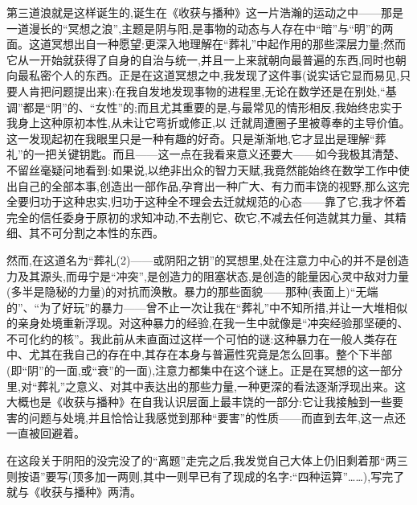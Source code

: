 第三道浪就是这样诞生的,诞生在《收获与播种》这一片浩瀚的运动之中——那是一道漫长的“冥想之浪”,主题是阴与阳,是事物的动态与人存在中“暗”与“明”的两面。这道冥想出自一种愿望:更深入地理解在“葬礼”中起作用的那些深层力量;然而它从一开始就获得了自身的自治与统一,并且一上来就朝向最普遍的东西,同时也朝向最私密个人的东西。正是在这道冥想之中,我发现了这件事(说实话它显而易见,只要人肯把问题提出来):在我自发地发现事物的进程里,无论在数学还是在别处,“基调”都是“阴”的、“女性”的;而且尤其重要的是,与最常见的情形相反,我始终忠实于我身上这种原初本性,从未让它弯折或修正,以
%
迁就周遭圈子里被尊奉的主导价值。这一发现起初在我眼里只是一种有趣的好奇。只是渐渐地,它才显出是理解“葬礼”的一把关键钥匙。而且——这一点在我看来意义还要大——如今我极其清楚、不留丝毫疑问地看到:如果说,以绝非出众的智力天赋,我竟然能始终在数学工作中使出自己的全部本事,创造出一部作品,孕育出一种广大、有力而丰饶的视野,那么这完全要归功于这种忠实,归功于这种全不理会去迁就规范的心态——靠了它,我才怀着完全的信任委身于原初的求知冲动,不去削它、砍它,不减去任何造就其力量、其精细、其不可分割之本性的东西。

然而,在这道名为“葬礼(2)——或阴阳之钥”的冥想里,处在注意力中心的并不是创造力及其源头,而毋宁是“冲突”,是创造力的阻塞状态,是创造的能量因心灵中敌对力量(多半是隐秘的力量)的对抗而涣散。暴力的那些面貌——那种(表面上)“无端的”、“为了好玩”的暴力——曾不止一次让我在“葬礼”中不知所措,并让一大堆相似的亲身处境重新浮现。对这种暴力的经验,在我一生中就像是“冲突经验那坚硬的、不可化约的核”。我此前从未直面过这样一个可怕的谜:这种暴力在一般人类存在中、尤其在我自己的存在中,其存在本身与普遍性究竟是怎么回事。整个下半部(即“阴”的一面,或“衰”的一面),注意力都集中在这个谜上。正是在冥想的这一部分里,对“葬礼”之意义、对其中表达出的那些力量,一种更深的看法逐渐浮现出来。这大概也是《收获与播种》在自我认识层面上最丰饶的一部分:它让我接触到一些要害的问题与处境,并且恰恰让我感觉到那种“要害”的性质——而直到去年,这一点还一直被回避着。

在这段关于阴阳的没完没了的“离题”走完之后,我发觉自己大体上仍旧剩着那“两三则按语”要写(顶多加一两则,其中一则早已有了现成的名字:“四种运算”……),写完了就与《收获与播种》两清。

